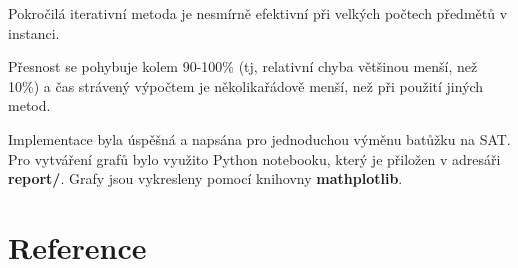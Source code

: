 \documentclass[a4paper,10pt,twocolumn]{article}
\begin{document}
\begin{itemize}
\begin{itemize}
Pokročilá iterativní metoda je nesmírně efektivní při velkých počtech předmětů v instanci.

Přesnost se pohybuje kolem 90-100\% (tj, relativní chyba většinou menší, než 10\%) a čas strávený výpočtem je několikařádově menší, než při použití jiných metod.

Implementace byla úspěšná a napsána pro jednoduchou výměnu batůžku  na SAT. \\
Pro vytváření grafů bylo využito Python notebooku, který je přiložen v adresáři \textbf{report/}. Grafy jsou vykresleny pomocí knihovny \textbf{mathplotlib}.

\section{Reference}










\end{itemize}
\end{itemize}
\end{document}
